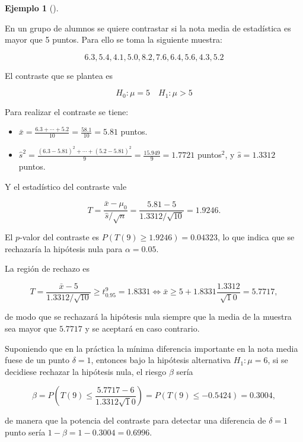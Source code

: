 \documentclass[
  a4paper,
]{scrreport}
\providecommand{\tightlist}{%
  \setlength{\itemsep}{0pt}\setlength{\parskip}{0pt}}\usepackage{longtable,booktabs,array}
\theoremstyle{plain}
\theoremstyle{definition}
\newtheorem{example}{Ejemplo}[chapter]
\theoremstyle{definition}
\theoremstyle{remark}
\begin{document}
\begin{example}[]\protect\hypertarget{exm-contraste-media-normal-varianza-desconocida}{}\label{exm-contraste-media-normal-varianza-desconocida}

En un grupo de alumnos se quiere contrastar si la nota media de
estadística es mayor que 5 puntos. Para ello se toma la siguiente
muestra:

\[
6.3, 5.4, 4.1, 5.0, 8.2, 7.6, 6.4, 5.6, 4.3, 5.2
\]

El contraste que se plantea es

\[H_0: \mu=5 \quad H_1: \mu>5\]

Para realizar el contraste se tiene:

\begin{itemize}
\tightlist
\item
  \(\bar x = \frac{6.3+\cdots+5.2}{10}=\frac{58.1}{10}=5.81\) puntos.
\item
  \(\hat s^2 = \frac{(6.3-5.81)^2+\cdots+(5.2-5.81)^2}{9} = \frac{15.949}{9}=1.7721\)
  puntos\(^2\), y \(\hat s=1.3312\) puntos.
\end{itemize}

Y el estadístico del contraste vale

\[
T=\frac{\bar x-\mu_0}{\hat s/\sqrt{n}} = \frac{5.81-5}{1.3312/\sqrt{10}}= 1.9246.
\]

El \(p\)-valor del contraste es \(P(T(9)\geq 1.9246) = 0.04323\), lo que
indica que se rechazaría la hipótesis nula para \(\alpha=0.05\).

La región de rechazo es

\[
T=\frac{\bar x-5}{1.3312/\sqrt{10}} \geq t^9_{0.95} = 1.8331 \Leftrightarrow \bar x \geq 5+1.8331\frac{1.3312}{\sqrt
10} = 5.7717,
\]

de modo que se rechazará la hipótesis nula siempre que la media de la
muestra sea mayor que \(5.7717\) y se aceptará en caso contrario.

Suponiendo que en la práctica la mínima diferencia importante en la nota
media fuese de un punto \(\delta=1\), entonces bajo la hipótesis
alternativa \(H_1:\mu=6\), si se decidiese rechazar la hipótesis nula,
el riesgo \(\beta\) sería

\[
\beta = P\left(T(9)\leq \frac{5.7717-6}{1.3312\sqrt 10}\right) = P(T(9)\leq -0.5424) = 0.3004,
\]

de manera que la potencia del contraste para detectar una diferencia de
\(\delta=1\) punto sería \(1-\beta=1-0.3004 = 0.6996\).

\end{example}
\end{document}
